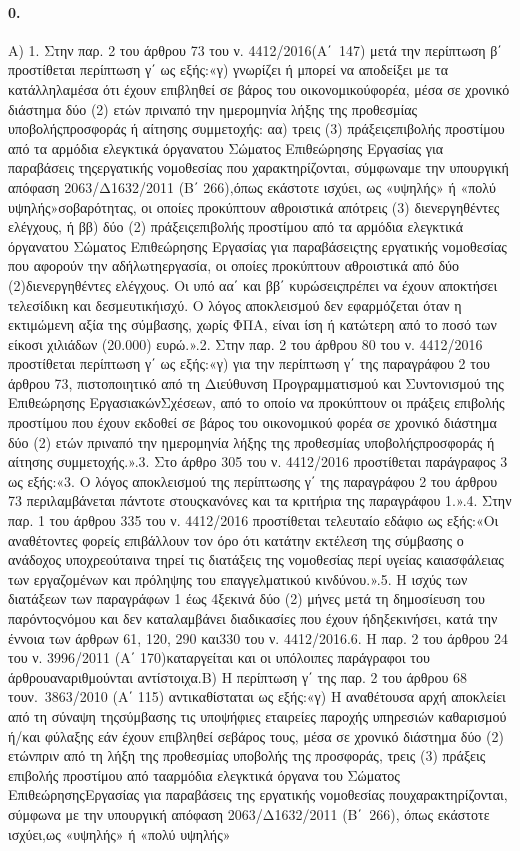 \documentclass[a4paper,oneside, 10pt]{book}
\begin{document}
\paragraph { 0. } Α) 1. Στην παρ. 2 του άρθρου 73 του ν. 4412/2016(Α΄ 147) μετά την περίπτωση β΄ προστίθεται περίπτωση γ΄ ως εξής:«γ) γνωρίζει ή μπορεί να αποδείξει με τα κατάλληλαμέσα ότι έχουν επιβληθεί σε βάρος του οικονομικούφορέα, μέσα σε χρονικό διάστημα δύο (2) ετών πριναπό την ημερομηνία λήξης της προθεσμίας υποβολήςπροσφοράς ή αίτησης συμμετοχής: αα) τρεις (3) πράξειςεπιβολής προστίμου από τα αρμόδια ελεγκτικά όργανατου Σώματος Επιθεώρησης Εργασίας για παραβάσεις τηςεργατικής νομοθεσίας που χαρακτηρίζονται, σύμφωναμε την υπουργική απόφαση 2063/Δ1632/2011 (Β΄ 266),όπως εκάστοτε ισχύει, ως «υψηλής» ή «πολύ υψηλής»σοβαρότητας, οι οποίες προκύπτουν αθροιστικά απότρεις (3) διενεργηθέντες ελέγχους, ή ββ) δύο (2) πράξειςεπιβολής προστίμου από τα αρμόδια ελεγκτικά όργανατου Σώματος Επιθεώρησης Εργασίας για παραβάσειςτης εργατικής νομοθεσίας που αφορούν την αδήλωτηεργασία, οι οποίες προκύπτουν αθροιστικά από δύο (2)διενεργηθέντες ελέγχους. Οι υπό αα΄ και ββ΄ κυρώσειςπρέπει να έχουν αποκτήσει τελεσίδικη και δεσμευτικήισχύ. Ο λόγος αποκλεισμού δεν εφαρμόζεται όταν η εκτιμώμενη αξία της σύμβασης, χωρίς ΦΠΑ, είναι ίση ή κατώτερη από το ποσό των είκοσι χιλιάδων (20.000) ευρώ.».2. Στην παρ. 2 του άρθρου 80 του ν. 4412/2016 προστίθεται περίπτωση γ΄ ως εξής:«γ) για την περίπτωση γ΄ της παραγράφου 2 του άρθρου 73, πιστοποιητικό από τη Διεύθυνση Προγραμματισμού και Συντονισμού της Επιθεώρησης ΕργασιακώνΣχέσεων, από το οποίο να προκύπτουν οι πράξεις επιβολής προστίμου που έχουν εκδοθεί σε βάρος του οικονομικού φορέα σε χρονικό διάστημα δύο (2) ετών πριναπό την ημερομηνία λήξης της προθεσμίας υποβολήςπροσφοράς ή αίτησης συμμετοχής.».3. Στο άρθρο 305 του ν. 4412/2016 προστίθεται παράγραφος 3 ως εξής:«3. Ο λόγος αποκλεισμού της περίπτωσης γ΄ της παραγράφου 2 του άρθρου 73 περιλαμβάνεται πάντοτε στουςκανόνες και τα κριτήρια της παραγράφου 1.».4. Στην παρ. 1 του άρθρου 335 του ν. 4412/2016 προστίθεται τελευταίο εδάφιο ως εξής:«Οι αναθέτοντες φορείς επιβάλλουν τον όρο ότι κατάτην εκτέλεση της σύμβασης ο ανάδοχος υποχρεούταινα τηρεί τις διατάξεις της νομοθεσίας περί υγείας καιασφάλειας των εργαζομένων και πρόληψης του επαγγελματικού κινδύνου.».5. Η ισχύς των διατάξεων των παραγράφων 1 έως 4ξεκινά δύο (2) μήνες μετά τη δημοσίευση του παρόντοςνόμου και δεν καταλαμβάνει διαδικασίες που έχουν ήδηξεκινήσει, κατά την έννοια των άρθρων 61, 120, 290 και330 του ν. 4412/2016.6. Η παρ. 2 του άρθρου 24 του ν. 3996/2011 (Α΄ 170)καταργείται και οι υπόλοιπες παράγραφοι του άρθρουαναριθμούνται αντίστοιχα.Β) Η περίπτωση γ΄ της παρ. 2 του άρθρου 68 τουν. 3863/2010 (Α΄ 115) αντικαθίσταται ως εξής:«γ) Η αναθέτουσα αρχή αποκλείει από τη σύναψη τηςσύμβασης τις υποψήφιες εταιρείες παροχής υπηρεσιών καθαρισμού ή/και φύλαξης εάν έχουν επιβληθεί σεβάρος τους, μέσα σε χρονικό διάστημα δύο (2) ετώνπριν από τη λήξη της προθεσμίας υποβολής της προσφοράς, τρεις (3) πράξεις επιβολής προστίμου από τααρμόδια ελεγκτικά όργανα του Σώματος ΕπιθεώρησηςΕργασίας για παραβάσεις της εργατικής νομοθεσίας πουχαρακτηρίζονται, σύμφωνα με την υπουργική απόφαση 2063/Δ1632/2011 (Β΄ 266), όπως εκάστοτε ισχύει,ως «υψηλής» ή «πολύ υψηλής» 
\end{document}
